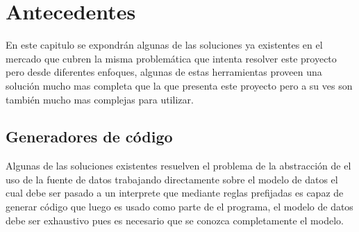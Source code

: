 \chapter{Antecedentes}
En este capitulo se expondrán algunas de las soluciones ya existentes en el mercado que cubren la misma problemática que intenta resolver este proyecto pero desde diferentes enfoques, algunas de estas herramientas proveen una solución mucho mas completa que la que presenta este proyecto pero a su ves son también mucho mas complejas para utilizar.
%
%
\section{Generadores de código}
Algunas de las soluciones existentes resuelven el problema de la abstracción de el uso de la fuente de datos trabajando directamente sobre el modelo de datos el cual debe ser pasado a un interprete que mediante reglas prefijadas es capaz de generar código que luego es usado como parte de el programa, el modelo de datos debe ser exhaustivo pues es necesario que se conozca completamente el modelo.

